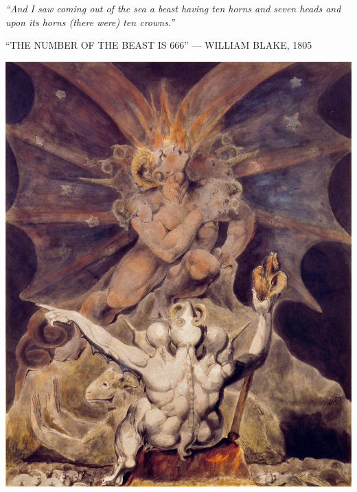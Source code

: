 \clearpage
\thispagestyle{empty}
\null\vfill
\settowidth{}
\begin{center}
\parbox{\longest}{%
  \raggedright{\huge\itshape%
    ``And I saw coming out of the sea a beast having ten horns and seven heads and upon its horns (there were) ten crowns.'' \par\bigskip
  }
  \raggedleft\Large\MakeUppercase{``The Number of the Beast is 666'' — William Blake, 1805}\par%
}
\vfill\vfill
\clearpage\newpage
\end{center}
\newpage
\thispagestyle{empty}
\begin{center}
	\includegraphics[width=1\textwidth]{images/illustrations/blakebeastnumber}
\end{center}